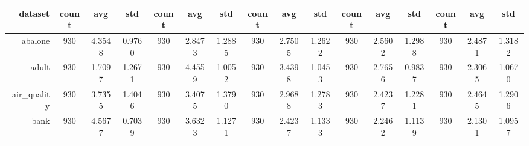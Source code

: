 \begin{table}[htbp]
{\begin{tabular}{rccccccccccccccc}
                  \cmidrule{2-16}    \textbf{dataset} & \textbf{count}                           & \textbf{avg}                                                              & \textbf{std}    & \textbf{count}                 & \textbf{avg}    & \textbf{std}    & \textbf{count}                  & \textbf{avg}    & \textbf{std}    & \textbf{count}                  & \textbf{avg}                                                              & \textbf{std}    & \textbf{count}                  & \textbf{avg}                                                                       & \textbf{std}    \\
                  \midrule
                  abalone                             & 930                                      & 4.3548                                                                    & 0.9760          & 930                            & 2.8473          & 1.2885          & 930                             & 2.7505          & 1.2622          & 930                             & 2.5602                                                                    & 1.2988          & 930                             & \cellcolor[rgb]{ .776,  .937,  .808}\textcolor[rgb]{ 0,  .38,  0}{2.4871}          & 1.3182          \\
                  adult                               & 930                                      & \cellcolor[rgb]{ .776,  .937,  .808}\textcolor[rgb]{ 0,  .38,  0}{1.7097} & 1.2671          & 930                            & 4.4559          & 1.0052          & 930                             & 3.4398          & 1.0453          & 930                             & 2.7656                                                                    & 0.9837          & 930                             & 2.3065                                                                             & 1.0670          \\
                  air\_quality                        & 930                                      & 3.7355                                                                    & 1.4046          & 930                            & 3.4075          & 1.3790          & 930                             & 2.9688          & 1.2783          & 930                             & \cellcolor[rgb]{ .776,  .937,  .808}\textcolor[rgb]{ 0,  .38,  0}{2.4237} & 1.2281          & 930                             & 2.4645                                                                             & 1.2906          \\
                  bank                                & 930                                      & 4.5677                                                                    & 0.7039          & 930                            & 3.6323          & 1.1271          & 930                             & 2.4237          & 1.1333          & 930                             & 2.2462                                                                    & 1.1139          & 930                             & \cellcolor[rgb]{ .776,  .937,  .808}\textcolor[rgb]{ 0,  .38,  0}{2.1301}          & 1.0957          \\

\end{tabular}}
\end{table}
